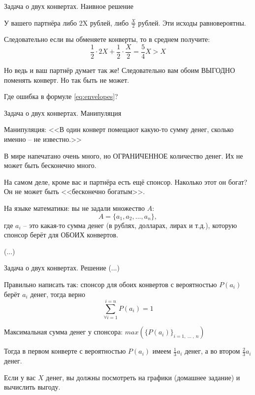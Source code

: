 \begin{frame}{Задача о двух конвертах. Наивное решение}

У вашего партнёра либо 2X рублей, либо
$\frac{X}{2}$ рублей. Эти исходы равновероятны.

Следовательно если вы обменяете конверты, то в среднем получите:
\begin{equation}\label{eq:envelopes}
	\frac{1}{2}\cdot2X + \frac{1}{2}\cdot\frac{X}{2}=\frac{5}{4}X	 > X
\end{equation}

Но ведь и ваш партнёр думает так же! 
Следовательно вам обоим ВЫГОДНО поменять конверт.
Но так быть не может.

Где ошибка в формуле \eqref{eq:envelopes}?
\end{frame}

\begin{frame}{Задача о двух конвертах. Манипуляция}

Манипуляция: 
<<В один конверт помещают какую-то сумму денег,
сколько именно -- не известно.>>

В мире напечатано очень много, но ОГРАНИЧЕННОЕ 
количество денег.
Их не может быть бесконечно много.

На самом деле, кроме вас и партнёра есть ещё спонсор.
Наколько этот он богат?
Он не может быть <<бесконечно богатым>>.

На языке математики: вы не задали множество $A$:
\begin{equation}
A = \{ a_1, a_2, ... , a_n\},
\end{equation}
где $a_i$ -- это какая-то сумма денег (в рублях, долларах, лирах и т.д.), которую спонсор берёт для ОБОИХ конвертов.

(...)
\end{frame}

\begin{frame}{Задача о двух конвертах. Решение}
\small
(...)

Правильно написать так:
спонсор для обоих конвертов с вероятностью $P(a_i)$ берёт $a_i$ денег,
тогда верно
\begin{equation}
\sum_{\forall i=1}^{i=n} P(a_i) = 1
\end{equation}

Максимальная сумма денег у спонсора: $max \left( \{ P(a_i) \}_{i=1,~...~,~n} \right)$

Тогда в первом конверте с вероятностью $P(a_i)$ имеем $\frac{1}{3} a_i$ денег,
а во втором $\frac{2}{3} a_i$ денег.


Если у вас $X$ денег,
вы должны посмотреть на графики (домашнее задание)
и вычислить выгоду.

	



\end{frame}

